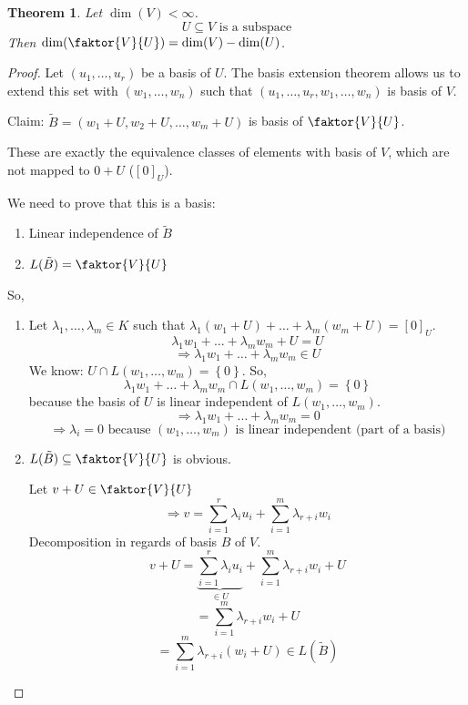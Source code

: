 \documentclass[a4paper,landscape,twocolumn]{article}
\newcommand\set[1]{\left\{#1\right\}}
\newtheorem{theorem}{Theorem}
\begin{document}
\begin{theorem}
  \label{satz-4-24}
  Let $\dim(V) < \infty$.
  \[ U \subseteq V \text{ is a subspace} \]
  Then $\dim(\faktor{V}{U}) = \dim(V) - \dim(U)$.
\end{theorem}
\begin{proof}
  Let $(u_1, \dots, u_r)$ be a basis of $U$.
  The basis extension theorem allows us to extend this set with
  $(w_1, \dots, w_n)$ such that $(u_1, \dots, u_r, w_1, \dots, w_n)$ is basis of $V$.

  Claim: $\tilde{B} = (w_1 + U, w_2 + U, \dots, w_m + U)$ is basis of $\faktor{V}{U}$.

  These are exactly the equivalence classes of elements with basis of $V$,
  which are not mapped to $0 + U$ ($[0]_U$).

  We need to prove that this is a basis:
  \begin{enumerate}
    \item Linear independence of $\tilde{B}$
    \item $L(\tilde{B}) = \faktor{V}{U}$
  \end{enumerate}
  So,
  \begin{enumerate}
    \item
      Let $\lambda_1, \dots, \lambda_m \in K$ such that $\lambda_1 (w_1 + U) + \dots + \lambda_m (w_m + U) = [0]_U$.
      \[ \lambda_1 w_1 + \dots + \lambda_m w_m + U = U \]
      \[ \Rightarrow \lambda_1 w_1 + \dots + \lambda_m w_m \in U \]
      We know: $U \cap L(w_1, \dots, w_m) = \set{0}$. So,
      \[ \lambda_1 w_1 + \dots + \lambda_m w_m \cap L(w_1, \dots, w_m) = \set{0} \]
      because the basis of $U$ is linear independent of $L(w_1, \dots, w_m)$.
      \[ \Rightarrow \lambda_1 w_1 + \dots + \lambda_m w_m = 0 \]
      \[ \Rightarrow \lambda_i = 0 \text{ because } (w_1, \dots, w_m) \text{ is linear independent (part of a basis)} \]
    \item
      $L(\tilde{B}) \subseteq \faktor{V}{U}$ is obvious.

      Let $v + U \in \faktor{V}{U}$
      \[ \Rightarrow v = \sum_{i=1}^r \lambda_i u_i + \sum_{i=1}^m \lambda_{r+i} w_i \]
      Decomposition in regards of basis $B$ of $V$.
      \[ v + U  = \underbrace{\sum_{i=1}^r \lambda_i u_i}_{\in U} + \sum_{i=1}^m \lambda_{r+i} w_i + U \]
      \[ = \sum_{i=1}^m \lambda_{r+i} w_i + U \]
      \[ = \sum_{i=1}^m \lambda_{r+i} \left(w_i + U\right) \in L(\tilde{B}) \]
  \end{enumerate}
\end{proof}
\end{document}
